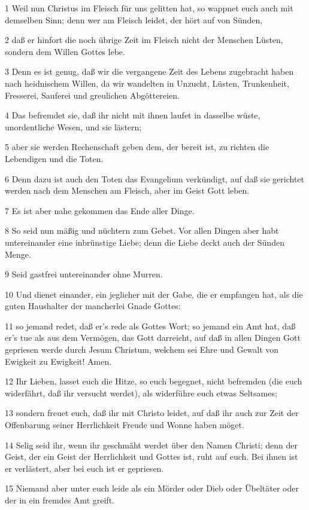 \par 1 Weil nun Christus im Fleisch für uns gelitten hat, so wappnet euch auch mit demselben Sinn; denn wer am Fleisch leidet, der hört auf von Sünden,
\par 2 daß er hinfort die noch übrige Zeit im Fleisch nicht der Menschen Lüsten, sondern dem Willen Gottes lebe.
\par 3 Denn es ist genug, daß wir die vergangene Zeit des Lebens zugebracht haben nach heidnischem Willen, da wir wandelten in Unzucht, Lüsten, Trunkenheit, Fresserei, Sauferei und greulichen Abgöttereien.
\par 4 Das befremdet sie, daß ihr nicht mit ihnen laufet in dasselbe wüste, unordentliche Wesen, und sie lästern;
\par 5 aber sie werden Rechenschaft geben dem, der bereit ist, zu richten die Lebendigen und die Toten.
\par 6 Denn dazu ist auch den Toten das Evangelium verkündigt, auf daß sie gerichtet werden nach dem Menschen am Fleisch, aber im Geist Gott leben.
\par 7 Es ist aber nahe gekommen das Ende aller Dinge.
\par 8 So seid nun mäßig und nüchtern zum Gebet. Vor allen Dingen aber habt untereinander eine inbrünstige Liebe; denn die Liebe deckt auch der Sünden Menge.
\par 9 Seid gastfrei untereinander ohne Murren.
\par 10 Und dienet einander, ein jeglicher mit der Gabe, die er empfangen hat, als die guten Haushalter der mancherlei Gnade Gottes:
\par 11 so jemand redet, daß er's rede als Gottes Wort; so jemand ein Amt hat, daß er's tue als aus dem Vermögen, das Gott darreicht, auf daß in allen Dingen Gott gepriesen werde durch Jesum Christum, welchem sei Ehre und Gewalt von Ewigkeit zu Ewigkeit! Amen.
\par 12 Ihr Lieben, lasset euch die Hitze, so euch begegnet, nicht befremden (die euch widerfährt, daß ihr versucht werdet), als widerführe euch etwas Seltsames;
\par 13 sondern freuet euch, daß ihr mit Christo leidet, auf daß ihr auch zur Zeit der Offenbarung seiner Herrlichkeit Freude und Wonne haben möget.
\par 14 Selig seid ihr, wenn ihr geschmäht werdet über den Namen Christi; denn der Geist, der ein Geist der Herrlichkeit und Gottes ist, ruht auf euch. Bei ihnen ist er verlästert, aber bei euch ist er gepriesen.
\par 15 Niemand aber unter euch leide als ein Mörder oder Dieb oder Übeltäter oder der in ein fremdes Amt greift.
